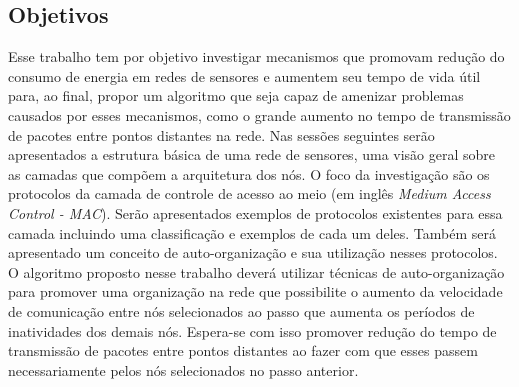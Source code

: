 \subsection{Objetivos}

Esse trabalho tem por objetivo investigar mecanismos que promovam redução do consumo de energia em redes de sensores e aumentem seu tempo de vida útil para, ao final, propor um algoritmo que seja capaz de amenizar problemas causados por esses mecanismos, como o grande aumento no tempo de transmissão de pacotes entre pontos distantes na rede. Nas sessões seguintes serão apresentados a estrutura básica de uma rede de sensores, uma visão geral sobre as camadas que compõem a arquitetura dos nós. O foco da investigação são os protocolos da camada de controle de acesso ao meio (em inglês \emph{Medium Access Control - MAC}). Serão apresentados exemplos de protocolos existentes para essa camada incluindo uma classificação e exemplos de cada um deles. Também será apresentado um conceito de auto-organização e sua utilização nesses protocolos. O algoritmo proposto nesse trabalho deverá utilizar técnicas de auto-organização para promover uma organização na rede que possibilite o aumento da velocidade de comunicação entre nós selecionados ao passo que aumenta os períodos de inatividades dos demais nós. Espera-se com isso promover redução do tempo de transmissão de pacotes entre pontos distantes ao fazer com que esses passem necessariamente pelos nós selecionados no passo anterior. 